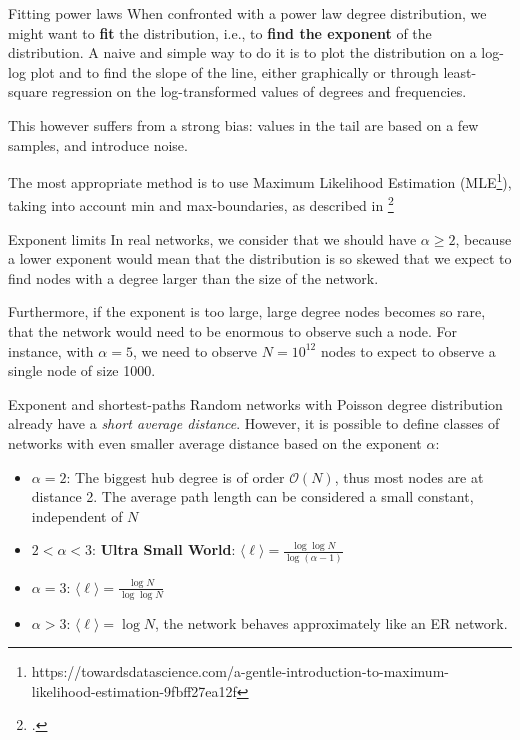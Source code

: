 \begin{textbox}{Fitting power laws}
    When confronted with a power law degree distribution, we might want to \textbf{fit} the distribution, i.e., to \textbf{find the exponent} of the distribution. A naive and simple way to do it is to plot the distribution on a log-log plot and to find the slope of the line, either graphically or through least-square regression on the log-transformed values of degrees and frequencies.

    This however suffers from a strong bias: values in the tail are based on a few samples, and introduce noise.

    The most appropriate method is to use Maximum Likelihood Estimation (MLE\footnote{https://towardsdatascience.com/a-gentle-introduction-to-maximum-likelihood-estimation-9fbff27ea12f}), taking into account min and max-boundaries, as described in \footcite{goldstein2004problems}
\end{textbox}

\begin{textbox}{Exponent limits}
    In real networks, we consider that we should have $\alpha\geq2$, because a lower exponent would mean that the distribution is so skewed that we expect to find nodes with a degree larger than the size of the network.

    Furthermore, if the exponent is too large, large degree nodes becomes so rare, that the network would need to be enormous to observe such a node. For instance, with $\alpha=5$, we need to observe $N=10^{12}$ nodes to expect to observe a single node of size 1000.
\end{textbox}

\begin{textbox}{Exponent and shortest-paths}
    Random networks with Poisson degree distribution already have a \textit{short average distance}. However, it is possible to define classes of networks with even smaller average distance based on the exponent $\alpha$:
    \begin{itemize}
        \item $\alpha=2$: The biggest hub degree is of order $\mathcal{O}(N)$, thus most nodes are at distance 2. The average path length can be considered a small constant, independent of $N$
        \item $2<\alpha<3$: \textbf{Ultra Small World}: $\langle \ell \rangle = \frac{\log \log N}{\log(\alpha-1)}$
        \item $\alpha=3$: $\langle \ell \rangle = \frac{ \log N}{\log \log N}$
        \item $\alpha>3$: $\langle \ell \rangle = \log N$, the network behaves approximately like an ER network.
    \end{itemize}
\end{textbox}

